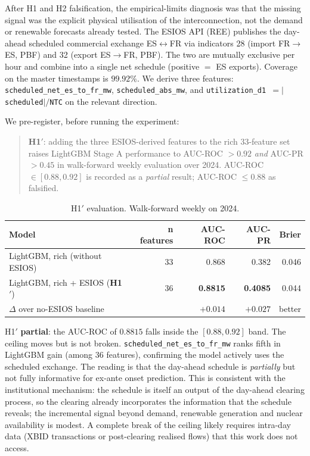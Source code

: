\documentclass[11pt,a4paper]{article}
\begin{document}
After H1 and H2 falsification, the empirical-limits diagnosis was that
the missing signal was the explicit physical utilisation of the
interconnection, not the demand or renewable forecasts already
tested. The ESIOS API (REE) publishes the day-ahead scheduled
commercial exchange ES$\leftrightarrow$FR via indicators 28 (import
FR$\to$ES, PBF) and 32 (export ES$\to$FR, PBF). The two are mutually
exclusive per hour and combine into a single net schedule (positive
$=$ ES exports). Coverage on the master timestamps is $99.92\%$. We
derive three features:
\texttt{scheduled\_net\_es\_to\_fr\_mw},
\texttt{scheduled\_abs\_mw}, and
\texttt{utilization\_d1 $= |$scheduled$|/$NTC} on the relevant
direction.

We pre-register, before running the experiment:

\begin{quote}
\textbf{H1$'$}: adding the three ESIOS-derived features to the
rich 33-feature set raises LightGBM Stage A performance to
AUC-ROC $> 0.92$ \emph{and} AUC-PR $> 0.45$ in walk-forward weekly
evaluation over 2024. AUC-ROC $\in [0.88, 0.92]$ is recorded as a
\emph{partial} result; AUC-ROC $\leq 0.88$ as falsified.
\end{quote}

\begin{table}[H]
\centering
\small
\caption{H1$'$ evaluation. Walk-forward weekly on 2024.}
\label{tab:h1prime}
\begin{tabular}{lrrrr}
\toprule
\textbf{Model} & \textbf{n features} & \textbf{AUC-ROC} &
\textbf{AUC-PR} & \textbf{Brier} \\
\midrule
LightGBM, rich (without ESIOS)         & 33 & 0.868 & 0.382 & 0.046 \\
LightGBM, rich + ESIOS (\textbf{H1$'$})  & 36 & \textbf{0.8815} & \textbf{0.4085} & 0.044 \\
$\Delta$ over no-ESIOS baseline        &  & $+0.014$ & $+0.027$ & better \\
\bottomrule
\end{tabular}
\end{table}

H1$'$ \textbf{partial}: the AUC-ROC of $0.8815$ falls inside the
$[0.88, 0.92]$ band. The ceiling moves but is not broken.
\texttt{scheduled\_net\_es\_to\_fr\_mw} ranks fifth in LightGBM gain
(among 36 features), confirming the model actively uses the
scheduled exchange. The reading is that the day-ahead schedule is
\emph{partially} but not fully informative for ex-ante onset
prediction. This is consistent with the institutional mechanism:
the schedule is itself an output of the day-ahead clearing process,
so the clearing already incorporates the information that the
schedule reveals; the incremental signal beyond demand, renewable
generation and nuclear availability is modest. A complete break of
the ceiling likely requires intra-day data (XBID transactions or
post-clearing realised flows) that this work does not access.
\end{document}
